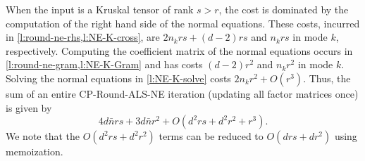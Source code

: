\documentclass{article}
\begin{document}
When the input is a Kruskal tensor of rank $s>r$, the cost is dominated by the computation of the right hand side of the normal equations.
These costs, incurred in \cref{l:round-ne-rhs,l:NE-K-cross}, are $2n_krs+(d-2)rs$ and $n_krs$ in mode $k$, respectively.
Computing the coefficient matrix of the normal equations occurs in \cref{l:round-ne-gram,l:NE-K-Gram} and has costs $(d-2)r^2$ and $n_kr^2$ in mode $k$.
Solving the normal equations in \cref{l:NE-K-solve} costs $2n_kr^2 + O(r^3)$.
Thus, the sum of an entire CP-Round-ALS-NE iteration (updating all factor matrices once) is given by
\begin{equation*}
4d\bar{n}rs + 3d\bar{n}r^2 + O(d^2rs + d^2r^2 + r^3).
\end{equation*}
We note that the $O(d^2rs+d^2r^2)$ terms can be reduced to $O(drs+dr^2)$ using memoization. 
\end{document}
